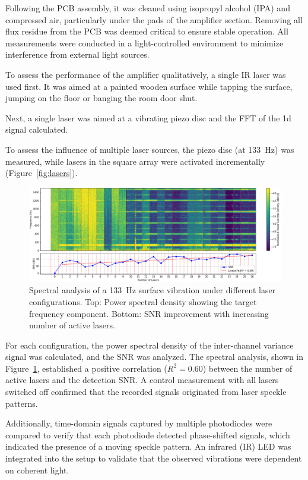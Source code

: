 Following the PCB assembly, it was cleaned using isopropyl alcohol (IPA) and compressed air, particularly under the pads of the amplifier section. 
Removing all flux residue from the PCB was deemed critical to ensure stable operation. 
All measurements were conducted in a light-controlled environment to minimize interference from external light sources.

To assess the performance of the amplifier qualitatively, a single IR laser was used first. 
It was aimed at a painted wooden surface while tapping the surface, jumping on the floor or banging the room door shut. 

Next, a single laser was aimed at a vibrating piezo disc and the FFT of the 1d signal calculated.

To assess the influence of multiple laser sources, the piezo disc (at 133~Hz) was measured,
while lasers in the square array were activated incrementally (Figure~\ref{fig:lasers}). 

\begin{figure}[t]
    \centering
    \includegraphics[width=\textwidth]{figures/results/multilaser_spectrogram}
    \caption{Spectral analysis of a 133~Hz surface vibration under different laser configurations. 
    Top: Power spectral density showing the target frequency component. Bottom: SNR improvement with increasing number of active lasers.}
    \label{fig:laser_snr}
\end{figure}

For each configuration, the power spectral density of the inter-channel variance signal was calculated, and the SNR was analyzed. 
The spectral analysis, shown in Figure~\ref{fig:laser_snr}, 
established a positive correlation ($R^2 = 0.60$) between the number of active lasers and the detection SNR. 
A control measurement with all lasers switched off confirmed that the recorded signals originated from laser speckle patterns.

Additionally, time-domain signals captured by multiple photodiodes were compared to verify that each photodiode detected phase-shifted signals, which indicated the presence of a moving speckle pattern. 
An infrared (IR) LED was integrated into the setup to validate that the observed vibrations were dependent on coherent light.

